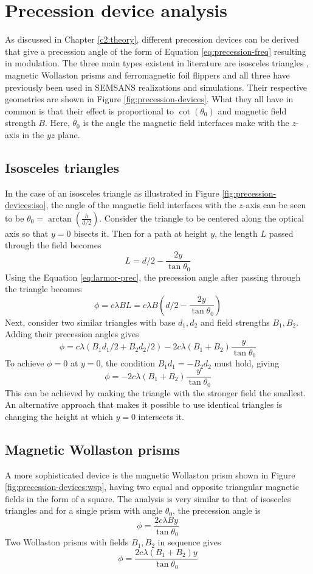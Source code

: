 \section{Precession device analysis}
\label{c3.3}
As discussed in Chapter \ref{c2:theory}, different precession devices can be derived that give a precession angle of the form of Equation \eqref{eq:precession-freq} resulting in modulation. The three main types existent in literature are isosceles triangles \cite{sales2015}, magnetic Wollaston prisms \cite{li2021} and ferromagnetic foil flippers \cite{bouwman2021b} and all three have previously been used in SEMSANS realizations and simulations. Their respective geometries are shown in Figure \ref{fig:precession-devices}. What they all have in common is that their effect is proportional to $\cot(\theta_0)$ and magnetic field strength $B$. Here, $\theta_0$ is the angle the magnetic field interfaces make with the $z$-axis in the $yz$ plane.
\subsection{Isosceles triangles}
In the case of an isosceles triangle as illustrated in Figure \ref{fig:precession-devices:iso}, the angle of the magnetic field interfaces with the $z$-axis can be seen to be $\theta_0 = \arctan\left(\frac{h}{d/2}\right)$. Consider the triangle to be centered along the optical axis so that $y=0$ bisects it. Then for a path at height $y$, the length $L$ passed through the field becomes
$$L = d/2 - \frac{2y}{\tan\theta_0}$$
Using the Equation \eqref{eq:larmor-prec}, the precession angle after passing through the triangle becomes
$$\phi = c\lambda B L = c\lambda B(d/2 - \frac{2y}{\tan\theta_0})$$
Next, consider two similar triangles with base $d_1, d_2$ and field strengths $B_1, B_2$. Adding their precession angles gives 
$$\phi = c\lambda (B_1d_1/2 +B_2d_2/2) - 2c\lambda (B_1 + B_2) \frac{y}{\tan\theta_0}$$
To achieve $\phi = 0$ at $y=0$, the condition $B_1d_1 = -B_2d_2$ must hold, giving 
$$\phi = -2c\lambda (B_1 + B_2) \frac{y}{\tan\theta_0}$$
This can be achieved by making the triangle with the stronger field the smallest. An alternative approach that makes it possible to use identical triangles is changing the height at which $y=0$ intersects it.

\subsection{Magnetic Wollaston prisms}
A more sophisticated device is the magnetic Wollaston prism shown in Figure \ref{fig:precession-devices:wsp}, having two equal and opposite triangular magnetic fields in the form of a square. The analysis is very similar to that of isosceles triangles and for a single prism with angle $\theta_0$, the precession angle is
$$\phi = \frac{2c\lambda B y}{\tan{\theta_0}}$$
Two Wollaston prisms with fields $B_1, B_2$ in sequence gives
$$\phi = \frac{2c\lambda (B_1 + B_2) y}{\tan{\theta_0}}$$
